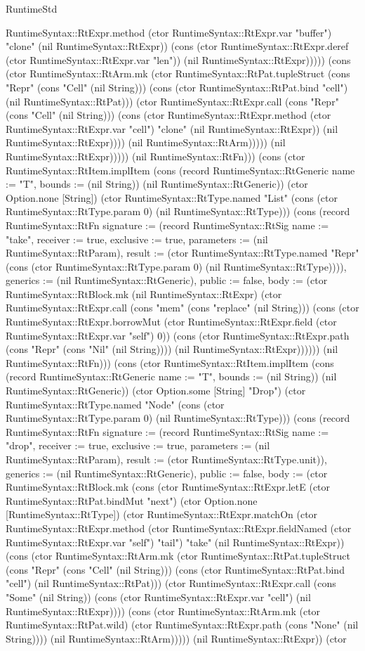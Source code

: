 \begin{lexlean}{RuntimeStd}
\begin{semanticmodule}
{RuntimeSyntax::RtExpr.method (ctor RuntimeSyntax::RtExpr.var "buffer") "clone" (nil RuntimeSyntax::RtExpr)) (cons (ctor RuntimeSyntax::RtExpr.deref (ctor RuntimeSyntax::RtExpr.var "len")) (nil RuntimeSyntax::RtExpr))))) (cons (ctor RuntimeSyntax::RtArm.mk (ctor RuntimeSyntax::RtPat.tupleStruct (cons "Repr" (cons "Cell" (nil String))) (cons (ctor RuntimeSyntax::RtPat.bind "cell") (nil RuntimeSyntax::RtPat))) (ctor RuntimeSyntax::RtExpr.call (cons "Repr" (cons "Cell" (nil String))) (cons (ctor RuntimeSyntax::RtExpr.method (ctor RuntimeSyntax::RtExpr.var "cell") "clone" (nil RuntimeSyntax::RtExpr)) (nil RuntimeSyntax::RtExpr)))) (nil RuntimeSyntax::RtArm))))) (nil RuntimeSyntax::RtExpr))))}) (nil RuntimeSyntax::RtFn))) (cons (ctor RuntimeSyntax::RtItem.implItem (cons (record RuntimeSyntax::RtGeneric {name := "T", bounds := (nil String)}) (nil RuntimeSyntax::RtGeneric)) (ctor Option.none [String]) (ctor RuntimeSyntax::RtType.named "List" (cons (ctor RuntimeSyntax::RtType.param 0) (nil RuntimeSyntax::RtType))) (cons (record RuntimeSyntax::RtFn {signature := (record RuntimeSyntax::RtSig {name := "take", receiver := true, exclusive := true, parameters := (nil RuntimeSyntax::RtParam), result := (ctor RuntimeSyntax::RtType.named "Repr" (cons (ctor RuntimeSyntax::RtType.param 0) (nil RuntimeSyntax::RtType)))}), generics := (nil RuntimeSyntax::RtGeneric), public := false, body := (ctor RuntimeSyntax::RtBlock.mk (nil RuntimeSyntax::RtExpr) (ctor RuntimeSyntax::RtExpr.call (cons "mem" (cons "replace" (nil String))) (cons (ctor RuntimeSyntax::RtExpr.borrowMut (ctor RuntimeSyntax::RtExpr.field (ctor RuntimeSyntax::RtExpr.var "self") 0)) (cons (ctor RuntimeSyntax::RtExpr.path (cons "Repr" (cons "Nil" (nil String)))) (nil RuntimeSyntax::RtExpr)))))}) (nil RuntimeSyntax::RtFn))) (cons (ctor RuntimeSyntax::RtItem.implItem (cons (record RuntimeSyntax::RtGeneric {name := "T", bounds := (nil String)}) (nil RuntimeSyntax::RtGeneric)) (ctor Option.some [String] "Drop") (ctor RuntimeSyntax::RtType.named "Node" (cons (ctor RuntimeSyntax::RtType.param 0) (nil RuntimeSyntax::RtType))) (cons (record RuntimeSyntax::RtFn {signature := (record RuntimeSyntax::RtSig {name := "drop", receiver := true, exclusive := true, parameters := (nil RuntimeSyntax::RtParam), result := (ctor RuntimeSyntax::RtType.unit)}), generics := (nil RuntimeSyntax::RtGeneric), public := false, body := (ctor RuntimeSyntax::RtBlock.mk (cons (ctor RuntimeSyntax::RtExpr.letE (ctor RuntimeSyntax::RtPat.bindMut "next") (ctor Option.none [RuntimeSyntax::RtType]) (ctor RuntimeSyntax::RtExpr.matchOn (ctor RuntimeSyntax::RtExpr.method (ctor RuntimeSyntax::RtExpr.fieldNamed (ctor RuntimeSyntax::RtExpr.var "self") "tail") "take" (nil RuntimeSyntax::RtExpr)) (cons (ctor RuntimeSyntax::RtArm.mk (ctor RuntimeSyntax::RtPat.tupleStruct (cons "Repr" (cons "Cell" (nil String))) (cons (ctor RuntimeSyntax::RtPat.bind "cell") (nil RuntimeSyntax::RtPat))) (ctor RuntimeSyntax::RtExpr.call (cons "Some" (nil String)) (cons (ctor RuntimeSyntax::RtExpr.var "cell") (nil RuntimeSyntax::RtExpr)))) (cons (ctor RuntimeSyntax::RtArm.mk (ctor RuntimeSyntax::RtPat.wild) (ctor RuntimeSyntax::RtExpr.path (cons "None" (nil String)))) (nil RuntimeSyntax::RtArm))))) (nil RuntimeSyntax::RtExpr)) (ctor }
\end{semanticmodule}
\end{lexlean}
